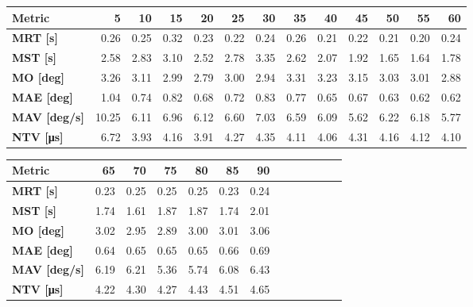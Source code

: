 \begin{tabular*}{\textwidth}{@{\extracolsep{\fill}}l|rrrrrrrrrrrr}
    \toprule
    \textbf{Metric} & \textbf{5} & \textbf{10} & \textbf{15} & \textbf{20} & \textbf{25} & \textbf{30} & \textbf{35} & \textbf{40} & \textbf{45} & \textbf{50} & \textbf{55} & \textbf{60} \\
    \midrule
    \textbf{MRT [s]} & 0.26 & 0.25 & 0.32 & 0.23 & 0.22 & 0.24 & 0.26 & 0.21 & 0.22 & 0.21 & 0.20 & 0.24 \\
    \textbf{MST [s]} & 2.58 & 2.83 & 3.10 & 2.52 & 2.78 & 3.35 & 2.62 & 2.07 & 1.92 & 1.65 & 1.64 & 1.78 \\
    \textbf{MO  [deg]} & 3.26 & 3.11 & 2.99 & 2.79 & 3.00 & 2.94 & 3.31 & 3.23 & 3.15 & 3.03 & 3.01 & 2.88 \\
    \textbf{MAE [deg]} & 1.04 & 0.74 & 0.82 & 0.68 & 0.72 & 0.83 & 0.77 & 0.65 & 0.67 & 0.63 & 0.62 & 0.62 \\
    \textbf{MAV [deg/s]} & 10.25 & 6.11 & 6.96 & 6.12 & 6.60 & 7.03 & 6.59 & 6.09 & 5.62 & 6.22 & 6.18 & 5.77 \\
    \textbf{NTV [\si{\micro\second}]} & 6.72 & 3.93 & 4.16 & 3.91 & 4.27 & 4.35 & 4.11 & 4.06 & 4.31 & 4.16 & 4.12 & 4.10 \\
    \bottomrule
\end{tabular*}

\begin{tabular*}{\textwidth}{@{\extracolsep{\fill}}l|rrrrrrrrrrrr}
    \toprule
    \textbf{Metric} & \textbf{65} & \textbf{70} & \textbf{75} & \textbf{80} & \textbf{85} & \textbf{90} &&&&&&\\
    \midrule
    \textbf{MRT [s]} & 0.23 & 0.25 & 0.25 & 0.25 & 0.23 & 0.24 &&&&&&\\
    \textbf{MST [s]} & 1.74 & 1.61 & 1.87 & 1.87 & 1.74 & 2.01 &&&&&&\\
    \textbf{MO  [deg]} & 3.02 & 2.95 & 2.89 & 3.00 & 3.01 & 3.06 &&&&&&\\
    \textbf{MAE [deg]} & 0.64 & 0.65 & 0.65 & 0.65 & 0.66 & 0.69 &&&&&&\\
    \textbf{MAV [deg/s]} & 6.19 & 6.21 & 5.36 & 5.74 & 6.08 & 6.43 &&&&&&\\
    \textbf{NTV [\si{\micro\second}]} & 4.22 & 4.30 & 4.27 & 4.43 & 4.51 & 4.65 &&&&&&\\
    \bottomrule
\end{tabular*}

